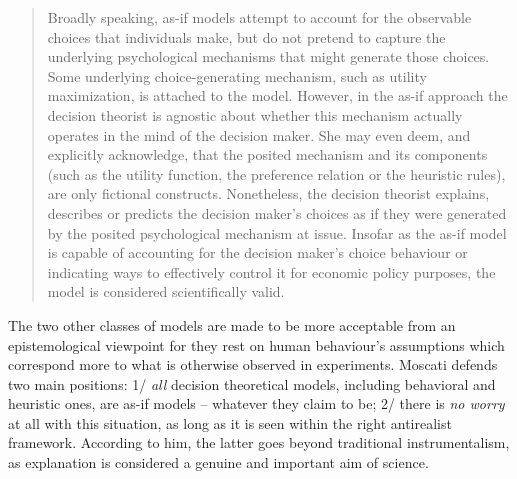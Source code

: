 \documentclass[a4paper,11pt]{article}
\theoremstyle{definition}
\begin{document}
\begin{quote}
    Broadly speaking, as-if models attempt to account for the observable choices that individuals make, but do not pretend to capture the underlying psychological mechanisms that might generate those choices. Some underlying choice-generating mechanism, such as utility maximization, is attached to the model. However, in the as-if approach the decision theorist is agnostic about whether this mechanism actually operates in the mind of the decision maker. She may even deem, and explicitly acknowledge, that the posited mechanism and its components (such as the utility function, the preference relation or the heuristic rules), are only fictional constructs. Nonetheless, the decision theorist explains, describes or predicts the decision maker’s choices as if they were generated by the posited psychological mechanism at issue. Insofar as the as-if model is capable of accounting for the decision maker’s choice behaviour or indicating ways to effectively control it for economic policy purposes, the model is considered scientifically valid.
\end{quote}

The two other classes of models are made to be more acceptable from an epistemological viewpoint for they rest on human behaviour's assumptions which correspond more to what is otherwise observed in experiments. Moscati defends two main positions: 1/ \textit{all} decision theoretical models, including behavioral and heuristic ones, are as-if models -- whatever they claim to be; 2/ there is \textit{no worry} at all with this situation, as long as it is seen within the right antirealist framework. According to him, the latter goes beyond traditional instrumentalism, as explanation is considered a genuine and important aim of science. 
\end{document}
